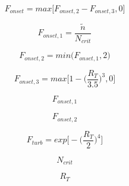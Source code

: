 {\newpage\clearpage
{}%
\begin{displaymath}
F_{onset} = {max} \Big[ F_{onset,2} - F_{onset,3}, 0 \Big]
\end{displaymath}%
\lthtmldisplayZ
\lthtmlcheckvsize\clearpage}

{\newpage\clearpage
{}%
\begin{displaymath}
F_{onset,1} = \frac{\tilde{n}}{N_{crit}}
\end{displaymath}%
\lthtmldisplayZ
\lthtmlcheckvsize\clearpage}

{\newpage\clearpage
{}%
\begin{displaymath}
F_{onset,2} = {min}\Big(F_{onset,1},2 \Big)
\end{displaymath}%
\lthtmldisplayZ
\lthtmlcheckvsize\clearpage}

{\newpage\clearpage
{}%
\begin{displaymath}
F_{onset,3} = {max} \Big[1 - \Big(\frac{R_T}{3.5}\Big)^3, 0 \Big]
\end{displaymath}%
\lthtmldisplayZ
\lthtmlcheckvsize\clearpage}

{\newpage\clearpage
{}%
\begin{displaymath}
F_{onset,1}
\end{displaymath}%
\lthtmldisplayZ
\lthtmlcheckvsize\clearpage}

{\newpage\clearpage
{}%
\begin{displaymath}
F_{onset,2}
\end{displaymath}%
\lthtmldisplayZ
\lthtmlcheckvsize\clearpage}

{\newpage\clearpage
{}%
\begin{displaymath}
F_{turb} = {exp} \bigg[ - \Big( \frac{R_T}{2} \Big)^4 \bigg]
\end{displaymath}%
\lthtmldisplayZ
\lthtmlcheckvsize\clearpage}

{\newpage\clearpage
{}%
\begin{displaymath}
N_{crit}
\end{displaymath}%
\lthtmldisplayZ
\lthtmlcheckvsize\clearpage}

{\newpage\clearpage
{}%
\begin{displaymath}
R_T
\end{displaymath}%
\lthtmldisplayZ
\lthtmlcheckvsize\clearpage}

